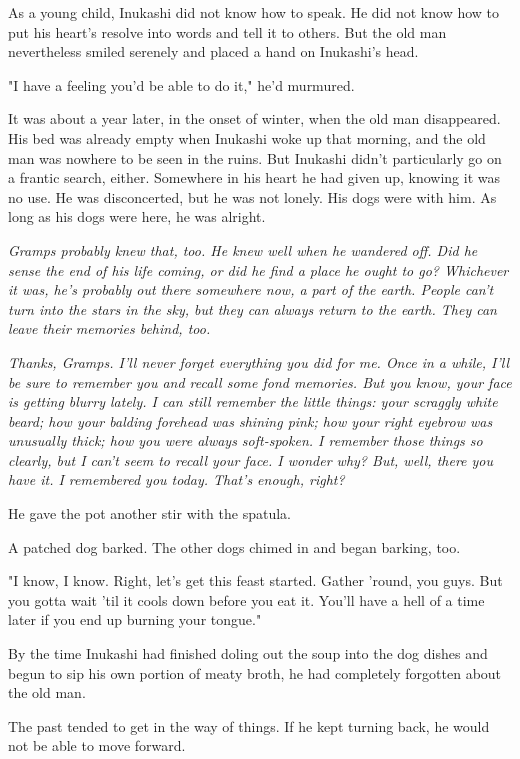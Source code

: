 As a young child, Inukashi did not know how to speak. He did not know
how to put his heart's resolve into words and tell it to others. But the
old man nevertheless smiled serenely and placed a hand on Inukashi's
head.

"I have a feeling you'd be able to do it," he'd murmured.

It was about a year later, in the onset of winter, when the old man
disappeared. His bed was already empty when Inukashi woke up that
morning, and the old man was nowhere to be seen in the ruins. But
Inukashi didn't particularly go on a frantic search, either. Somewhere
in his heart he had given up, knowing it was no use. He was
disconcerted, but he was not lonely. His dogs were with him. As long as
his dogs were here, he was alright.

\emph{Gramps probably knew that, too. He knew well when he wandered off. Did
he sense the end of his life coming, or did he find a place he ought to
go? Whichever it was, he's probably out there somewhere now, a part of
the earth. People can't turn into the stars in the sky, but they can
always return to the earth. They can leave their memories behind, too.}

\emph{Thanks, Gramps. I'll never forget everything you did for me. Once in a
while, I'll be sure to remember you and recall some fond memories. But
you know, your face is getting blurry lately. I can still remember the
little things: your scraggly white beard; how your balding forehead was
shining pink; how your right eyebrow was unusually thick; how you were
always soft-spoken. I remember those things so clearly, but I can't seem
to recall your face. I wonder why? But, well, there you have it. I
remembered you today. That's enough, right?}

He gave the pot another stir with the spatula.

A patched dog barked. The other dogs chimed in and began barking, too.

"I know, I know. Right, let's get this feast started. Gather 'round, you
guys. But you gotta wait 'til it cools down before you eat it. You'll
have a hell of a time later if you end up burning your tongue."

By the time Inukashi had finished doling out the soup into the dog
dishes and begun to sip his own portion of meaty broth, he had
completely forgotten about the old man.

The past tended to get in the way of things. If he kept turning back, he
would not be able to move forward.

